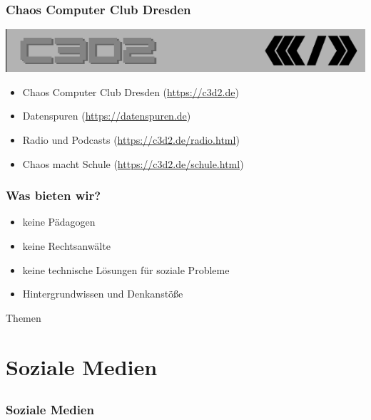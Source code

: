 \documentclass[12pt]{beamer}
\begin{document}
\begin{frame}
	\frametitle{Chaos Computer Club Dresden}
	\begin{center}
		\includegraphics[height=0.1\textheight]{img/c3d2_logo.png}
	\end{center}
	\begin{itemize}
		\item Chaos Computer Club Dresden (\url{https://c3d2.de})          
		\item Datenspuren (\url{https://datenspuren.de})
		\item Radio und Podcasts (\url{https://c3d2.de/radio.html})
		\item Chaos macht Schule (\url{https://c3d2.de/schule.html})
	\end{itemize}
\end{frame}

\begin{frame}
	\frametitle{Was bieten wir?}
	\begin{itemize}
		\item<2-> keine Pädagogen
		\item<3-> keine Rechtsanwälte
		\item<4-> keine technische Lösungen für soziale Probleme
		\item<5-> Hintergrundwissen und Denkanstöße
	\end{itemize}
\end{frame}

\begin{frame}{Themen}
\tableofcontents
\end{frame}

\section{Soziale Medien}
\subsection{}

\begin{frame}
  \frametitle{Soziale Medien}
  \begin{center}
  \end{center}
\end{frame}
\end{document}
